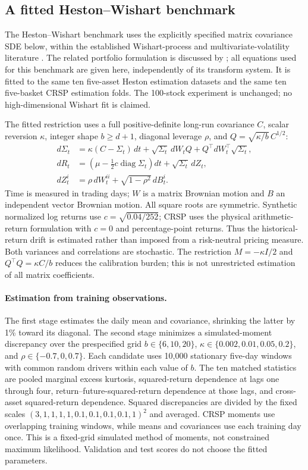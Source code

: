 \documentclass[11pt]{article}
\theoremstyle{definition}\newtheorem{definition}[theorem]{Definition}
\theoremstyle{remark}\newtheorem{remark}[theorem]{Remark}
\begin{document}
\subsection{A fitted Heston--Wishart benchmark}\label{sec:wishart-fit}
The Heston--Wishart benchmark uses the explicitly specified matrix covariance SDE below, within the established Wishart-process and multivariate-volatility literature \citep{bru1991,gourieroux2006,dafonseca2008wishart}. The related portfolio formulation is discussed by \citet{noguer2025wishart}; all equations used for this benchmark are given here, independently of its transform system. It is fitted to the same ten five-asset Heston estimation datasets and the same ten five-basket CRSP estimation folds. The 100-stock experiment is unchanged; no high-dimensional Wishart fit is claimed.

The fitted restriction uses a full positive-definite long-run covariance $C$, scalar reversion $\kappa$, integer shape $b\ge d+1$, diagonal leverage $\rho$, and $Q=\sqrt{\kappa/b}\,C^{1/2}$:
\begin{align}
d\Sigma_t&=\kappa(C-\Sigma_t)\,dt+\sqrt{\Sigma_t}\,dW_tQ+Q^\top dW_t^\top\sqrt{\Sigma_t},\label{eq:wishart-fit}\\
dR_t&=\left(\mu-\tfrac12 c\operatorname{diag}\Sigma_t\right)dt+\sqrt{\Sigma_t}\,dZ_t,\nonumber\\
dZ_t^i&=\rho\,dW_t^{ii}+\sqrt{1-\rho^2}\,dB_t^i.\nonumber
\end{align}
Time is measured in trading days; $W$ is a matrix Brownian motion and $B$ an independent vector Brownian motion. All square roots are symmetric. Synthetic normalized log returns use $c=\sqrt{0.04/252}$; CRSP uses the physical arithmetic-return formulation with $c=0$ and percentage-point returns. Thus the historical-return drift is estimated rather than imposed from a risk-neutral pricing measure. Both variances and correlations are stochastic. The restriction $M=-\kappa I/2$ and $Q^\top Q=\kappa C/b$ reduces the calibration burden; this is not unrestricted estimation of all matrix coefficients.

\paragraph{Estimation from training observations.}
The first stage estimates the daily mean and covariance, shrinking the latter by 1\% toward its diagonal. The second stage minimizes a simulated-moment discrepancy over the prespecified grid $b\in\{6,10,20\}$, $\kappa\in\{0.002,0.01,0.05,0.2\}$, and $\rho\in\{-0.7,0,0.7\}$. Each candidate uses 10,000 stationary five-day windows with common random drivers within each value of $b$. The ten matched statistics are pooled marginal excess kurtosis, squared-return dependence at lags one through four, return--future-squared-return dependence at those lags, and cross-asset squared-return dependence. Squared discrepancies are divided by the fixed scales $(3,1,1,1,1,0.1,0.1,0.1,0.1,1)^2$ and averaged. CRSP moments use overlapping training windows, while means and covariances use each training day once. This is a fixed-grid simulated method of moments, not constrained maximum likelihood. Validation and test scores do not choose the fitted parameters.
\end{document}
